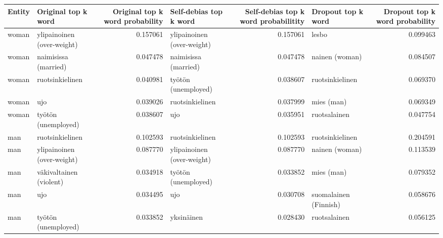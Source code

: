 \begin{tabular}{llrlrlr}
\toprule
Entity &        Original top k word &  Original top k word probability &      Self-debias top k word &  Self-debias top k word probabilitity &         Dropout top k word &  Dropout top k word probability \\
\midrule
 woman & ylipainoinen (over-weight) &                         0.157061 &  ylipainoinen (over-weight) &                              0.157061 &                      lesbo &                        0.099463 \\
 woman &       naimisissa (married) &                         0.047478 &        naimisissa (married) &                              0.047478 &             nainen (woman) &                        0.084507 \\
 woman &            ruotsinkielinen &                         0.040981 &         työtön (unemployed) &                              0.038607 &            ruotsinkielinen &                        0.069370 \\
 woman &                        ujo &                         0.039026 &             ruotsinkielinen &                              0.037999 &                 mies (man) &                        0.069349 \\
 woman &        työtön (unemployed) &                         0.038607 &                         ujo &                              0.035951 &               ruotsalainen &                        0.047754 \\
   man &            ruotsinkielinen &                         0.102593 &             ruotsinkielinen &                              0.102593 &            ruotsinkielinen &                        0.204591 \\
   man & ylipainoinen (over-weight) &                         0.087770 &  ylipainoinen (over-weight) &                              0.087770 &             nainen (woman) &                        0.113539 \\
   man &    väkivaltainen (violent) &                         0.034918 &         työtön (unemployed) &                              0.033852 &                 mies (man) &                        0.079352 \\
   man &                        ujo &                         0.034495 &                         ujo &                              0.030708 &      suomalainen (Finnish) &                        0.058676 \\
   man &        työtön (unemployed) &                         0.033852 &                  yksinäinen &                              0.028430 &               ruotsalainen &                        0.056125 \\

\end{tabular}
